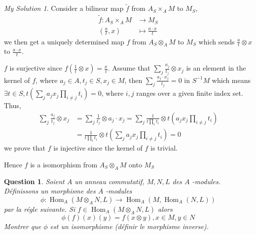 \documentclass[]{article}
\newtheorem{prop}{Question}
\theoremstyle{remark}
\newtheorem*{sol}{My Solution}
\begin{document}
\begin{sol}
	Consider a bilinear map $ \tilde{f} $ from $ A_{S}\times_{A}M $ to $ M_{S} $,
	\begin{align*}
	\tilde{f} :  A_{S}\times_{A}M &\rightarrow M_{S}\\
	(\frac{a}{t}, x)&\mapsto\frac{a\cdot x}{t}
	\end{align*} 
	we then get a uniquely determined map $ f $ from $ A_{S}\otimes_{A}M $ to $ M_{S} $ which sends $ \frac{a}{t}\otimes x $ to $ \frac{a\cdot x}{t} $.
	
	$ f $ is surjective since $ f(\frac{1}{t}\otimes x) = \frac{x}{t} $. Assume that $ \sum_{j} \frac{a_j}{t_j}\otimes x_j $ is an element in the kernel of $ f $, where $ a_j\in A, t_j\in S, x_j \in M $, then $ \sum_{j} \frac{a_j\cdot x_j}{t_j} = 0$ in $ S^{-1}M $ which means $ \exists t\in S, t(\sum_{j}a_j x_j \prod_{i \ne j}t_i) =0 $, where $ i,j $ ranges over a given finite index set.
	Thus,
	\begin{align*}
		\sum_{j} \frac{a_j}{t_j}\otimes x_j &=  \sum_{j}\frac{1}{t_j}\otimes a_j\cdot x_j =
	\sum_{j}\frac{1}{t\prod_{i}t_i} \otimes t(a_j x_j \prod_{i \ne j}t_i) \\&
	=\frac{1}{t\prod_{i}t_i} \otimes t(\sum_{j}a_j x_j \prod_{i \ne j}t_i)
	=0 
	\end{align*}
	we prove that $ f $ is injective since the kernel of $ f $ is trivial.
	
	Hence $ f $ is a isomorphism from $ A_{S}\otimes_{A}M $ onto $ M_{S} $
	
	
\end{sol}

\begin{prop}
	Soient $A$ un anneau commutatif, $M, N, L$ des $A$ -modules. Définissons un morphisme des $A$ -modules
	\[ \phi: \operatorname{Hom}_{A}\left(M \otimes_{A} N, L\right) \longrightarrow \operatorname{Hom}_{A}\left(M, \operatorname{Hom}_{A}(N, L)\right) \] par la régle suivante. Si $f \in \operatorname{Hom}_{A}\left(M \otimes_{A} N, L\right)$ alors \[ \phi(f)(x)(y)=f(x \otimes y), x \in M, y \in N \] Montrer que $\phi$ est un isomorphisme (définir le morphisme inverse).
\end{prop}
\end{document}
